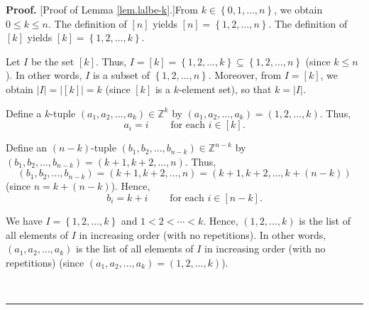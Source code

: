 \documentclass[numbers=enddot,12pt,final,onecolumn,notitlepage,english]{scrartcl}%
\theoremstyle{definition}
\newenvironment{proof}[1][Proof]{\noindent\textbf{#1.} }{\ \rule{0.5em}{0.5em}}
\newenvironment{verlong}{}{}
\begin{document}
\begin{verlong}
\begin{proof}
[Proof of Lemma \ref{lem.lalbe-k}.]From $k\in\left\{  0,1,\ldots,n\right\}  $,
we obtain $0\leq k\leq n$. The definition of $\left[  n\right]  $ yields
$\left[  n\right]  =\left\{  1,2,\ldots,n\right\}  $. The definition of
$\left[  k\right]  $ yields $\left[  k\right]  =\left\{  1,2,\ldots,k\right\}
$.

Let $I$ be the set $\left[  k\right]  $. Thus, $I=\left[  k\right]  =\left\{
1,2,\ldots,k\right\}  \subseteq\left\{  1,2,\ldots,n\right\}  $ (since $k\leq
n$). In other words, $I$ is a subset of $\left\{  1,2,\ldots,n\right\}  $.
Moreover, from $I=\left[  k\right]  $, we obtain $\left\vert I\right\vert
=\left\vert \left[  k\right]  \right\vert =k$ (since $\left[  k\right]  $ is a
$k$-element set), so that $k=\left\vert I\right\vert $.

Define a $k$-tuple $\left(  a_{1},a_{2},\ldots,a_{k}\right)  \in\mathbb{Z}%
^{k}$ by $\left(  a_{1},a_{2},\ldots,a_{k}\right)  =\left(  1,2,\ldots
,k\right)  $. Thus,%
\begin{equation}
a_{i}=i\ \ \ \ \ \ \ \ \ \ \text{for each }i\in\left[  k\right]  .
\label{pf.lem.lalbe-k.ai=}%
\end{equation}


Define an $\left(  n-k\right)  $-tuple $\left(  b_{1},b_{2},\ldots
,b_{n-k}\right)  \in\mathbb{Z}^{n-k}$ by \newline$\left(  b_{1},b_{2}%
,\ldots,b_{n-k}\right)  =\left(  k+1,k+2,\ldots,n\right)  $. Thus,
\[
\left(  b_{1},b_{2},\ldots,b_{n-k}\right)  =\left(  k+1,k+2,\ldots,n\right)
=\left(  k+1,k+2,\ldots,k+\left(  n-k\right)  \right)
\]
(since $n=k+\left(  n-k\right)  $). Hence,%
\begin{equation}
b_{i}=k+i\ \ \ \ \ \ \ \ \ \ \text{for each }i\in\left[  n-k\right]  .
\label{pf.lem.lalbe-k.bi=}%
\end{equation}


We have $I=\left\{  1,2,\ldots,k\right\}  $ and $1<2<\cdots<k$. Hence,
$\left(  1,2,\ldots,k\right)  $ is the list of all elements of $I$ in
increasing order (with no repetitions). In other words, $\left(  a_{1}%
,a_{2},\ldots,a_{k}\right)  $ is the list of all elements of $I$ in increasing
order (with no repetitions) (since $\left(  a_{1},a_{2},\ldots,a_{k}\right)
=\left(  1,2,\ldots,k\right)  $).


\end{proof}
\end{verlong}
\end{document}

